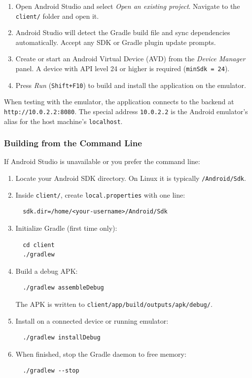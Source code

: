 \begin{enumerate}
  \item Open Android Studio and select \emph{Open an existing project}. Navigate to the \texttt{client/} folder and open it.
  \item Android Studio will detect the Gradle build file and sync dependencies automatically. Accept any SDK or Gradle plugin update prompts.
  \item Create or start an Android Virtual Device (AVD) from the \emph{Device Manager} panel. A device with API level 24 or higher is required (\texttt{minSdk = 24}).
  \item Press \emph{Run} (\texttt{Shift+F10}) to build and install the application on the emulator.
\end{enumerate}

When testing with the emulator, the application connects to the backend at \texttt{http://10.0.2.2:8080}. The special address \texttt{10.0.2.2} is the Android emulator's alias for the host machine's \texttt{localhost}.

\subsubsection{Building from the Command Line}

If Android Studio is unavailable or you prefer the command line:

\begin{enumerate}
  \item Locate your Android SDK directory. On Linux it is typically \texttt{\texttildelow/Android/Sdk}.
  \item Inside \texttt{client/}, create \texttt{local.properties} with one line:
  \begin{verbatim}
  sdk.dir=/home/<your-username>/Android/Sdk
  \end{verbatim}
  \item Initialize Gradle (first time only):
  \begin{verbatim}
  cd client
  ./gradlew
  \end{verbatim}
  \item Build a debug APK:
  \begin{verbatim}
  ./gradlew assembleDebug
  \end{verbatim}
  The APK is written to \texttt{client/app/build/outputs/apk/debug/}.
  \item Install on a connected device or running emulator:
  \begin{verbatim}
  ./gradlew installDebug
  \end{verbatim}
  \item When finished, stop the Gradle daemon to free memory:
  \begin{verbatim}
  ./gradlew --stop
  \end{verbatim}
\end{enumerate}

